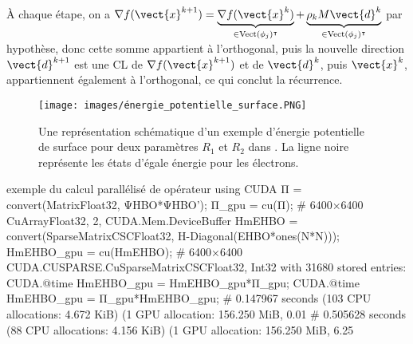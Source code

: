 À chaque étape, on a $\nabla f(\vect{x}^{k+1}) = \underbrace{\nabla f(\vect{x}^k)}_{\in \mathrm{Vect}(\phi_j)^\intercal} +  \underbrace{\rho_k M \vect{d}^k}_{\in \mathrm{Vect}(\phi_j)^\intercal}$ par hypothèse, donc cette somme appartient à l'orthogonal, puis la nouvelle direction $\vect{d}^{k+1}$ est une CL de $\nabla f(\vect{x}^{k+1})$ et de $\vect{d}^k$, puis $\vect{x}^k$, appartiennent également à l'orthogonal, ce qui conclut la récurrence.


\begin{figure}
    \centering
    \texttt{[image: images/énergie\_potentielle\_surface.PNG]}
    \caption{Une représentation schématique d'un exemple d'énergie potentielle de surface pour deux paramètres $R_1$ et $R_2$ dans \cite{tully_perspective_2000}. La ligne noire représente les états d'égale énergie pour les électrons. }
    \label{fig:en_pot_surf}
\end{figure}








 \begin{codejulia}{exemple du calcul parallélisé de opérateur}
    using CUDA
    Π = convert(Matrix{Float32}, ΨHBO*ΨHBO');
    Π_gpu = cu(Π);
    # 6400×6400 CuArray{Float32, 2, CUDA.Mem.DeviceBuffer}
    HmEHBO = convert(SparseMatrixCSC{Float32}, H-Diagonal(EHBO*ones(N*N))); 
    HmEHBO_gpu = cu(HmEHBO);
    # 6400×6400 CUDA.CUSPARSE.CuSparseMatrixCSC{Float32, Int32} with 31680 stored entries:
    CUDA.@time HmEHBO_gpu = HmEHBO_gpu*Π_gpu;
    CUDA.@time HmEHBO_gpu = Π_gpu*HmEHBO_gpu;
    # 0.147967 seconds (103 CPU allocations: 4.672 KiB) (1 GPU allocation: 156.250 MiB, 0.01%
    # 0.505628 seconds (88 CPU allocations: 4.156 KiB) (1 GPU allocation: 156.250 MiB, 6.25%
    \end{codejulia}